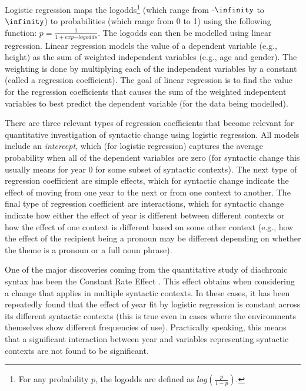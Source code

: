 	Logistic regression maps the logodds\footnote{For any probability $p$, the logodds are defined as $log(\frac{p}{1-p})$.} (which range from -$\infinity$ to $\infinity$) to probabilities (which range from 0 to 1) using the following function: $p=\frac{1}{1+exp{-logodds}}$. The logodds can then be modelled using linear regression. Linear regression models the value of a dependent variable (e.g., height) as the sum of weighted independent variables (e.g., age and gender). The weighting is done by multiplying each of the independent variables by a constant (called a regression coefficient). The goal of linear regression is to find the value for the regression coefficients that causes the sum of the weighted indepentent variables to best predict the dependent variable (for the data being modelled).

	There are three relevant types of regression coefficients that become relevant for quantitative investigation of syntactic change using logistic regression. All models include an \textit{intercept}, which (for logistic regression) captures the average probability when all of the dependent variables are zero (for syntactic change this usually means for year 0 for some subset of syntactic contexts). The next type of regression coefficient are simple effects, which for syntactic change indicate the effect of moving from one year to the next or from one context to another. The final type of regression coefficient are interactions, which for syntactic change indicate how either the effect of year is different between different contexts or how the effect of one context is different based on some other context (e.g., how the effect of the recipient being a pronoun may be different depending on whether the theme is a pronoun or a full noun phrase).

	One of the major discoveries coming from the quantitative study of diachronic syntax has been the Constant Rate Effect \citep{Kroch.1989,Kroch.1994}. This effect obtains when considering a change that applies in multiple syntactic contexts. In these cases, it has been repeatedly found that the effect of year fit by logistic regression is constant across its different syntactic contexts (this is true even in cases where the environments themselves show different frequencies of use). Practically speaking, this means that a significant interaction between year and variables representing syntactic contexts are not found to be significant.

